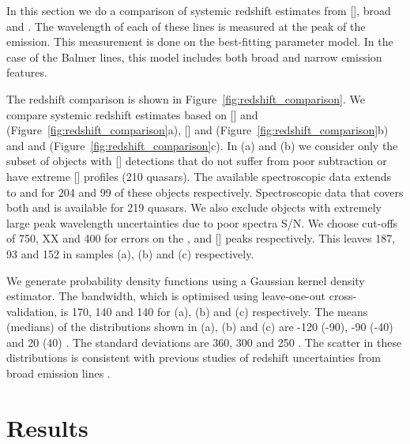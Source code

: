 In this section we do a comparison of systemic redshift estimates from [], broad \hb and \hans. 
The wavelength of each of these lines is measured at the peak of the emission. 
This measurement is done on the best-fitting parameter model. 
In the case of the Balmer lines, this model includes both broad and narrow emission features. 

The redshift comparison is shown in Figure~\ref{fig:redshift_comparison}. 
We compare systemic redshift estimates based on [] and \hb (Figure~\ref{fig:redshift_comparison}a), [] and \ha (Figure~\ref{fig:redshift_comparison}b) and \hb and \ha (Figure~\ref{fig:redshift_comparison}c). 
In (a) and (b) we consider only the subset of objects with [] detections that do not suffer from poor  subtraction or have extreme [] profiles (210 quasars). 
The available spectroscopic data extends to \hb and \ha for 204 and 99 of these objects respectively. 
Spectroscopic data that covers both \hb and \ha is available for 219 quasars. 
We also exclude objects with extremely large peak wavelength uncertainties due to poor spectra \ac{S/N}. 
We choose cut-offs of 750, XX and 400 for errors on the \hbns, \ha and [] peaks respectively. 
This leaves 187, 93 and 152 in samples (a), (b) and (c) respectively. 

We generate probability density functions using a Gaussian kernel density estimator.
The bandwidth, which is optimised using leave-one-out cross-validation, is 170, 140 and 140 \kms for (a), (b) and (c) respectively. 
The means (medians) of the distributions shown in (a), (b) and (c) are -120 (-90), -90 (-40) and 20 (40) \kms. 
The standard deviations are 360, 300 and 250 \kms. 
The scatter in these distributions is consistent with previous studies of redshift uncertainties from broad emission lines \citep[e.g.][]{shen16b}. 

\section{Results}

